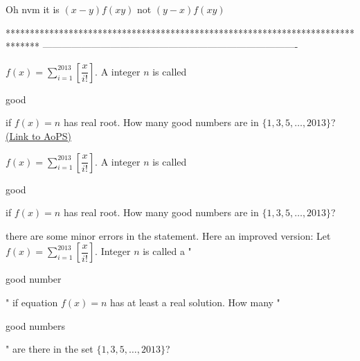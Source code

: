 \begin{solution}
	Oh nvm it is $(x-y)f(xy)$ not $(y-x)f(xy)$
\end{solution}
*******************************************************************************
-------------------------------------------------------------------------------

\begin{problem}
	$f(x)=\sum\limits_{i=1}^{2013}\left[\dfrac{x}{i!}\right]$. A integer $n$ is called \begin{italicized}good\end{italicized} if $f(x)=n$ has real root. How many good numbers are  in $\{1,3,5,\dotsc,2013\}$?
	\flushright \href{https://artofproblemsolving.com/community/c6h548151}{(Link to AoPS)}
\end{problem}



\begin{solution}
	\begin{tcolorbox}$f(x)=\sum\limits_{i=1}^{2013}\left[\dfrac{x}{i!}\right]$. A integer $n$ is called \begin{italicized}good\end{italicized} if $f(x)=n$ has real root. How many good numbers are  in $\{1,3,5,\dotsc,2013\}$?\end{tcolorbox}
there are some minor errors in the statement.
Here an improved version: Let $f(x)=\sum\limits_{i=1}^{2013}\left[\dfrac{x}{i!}\right]$. Integer $n$ is called a "\begin{italicized}good number\end{italicized}" if equation $f(x)=n$ has at least a real solution. How many "\begin{italicized}good numbers\end{italicized}" are there in the set $\{1,3,5,\dotsc,2013\}$?
\end{solution}



